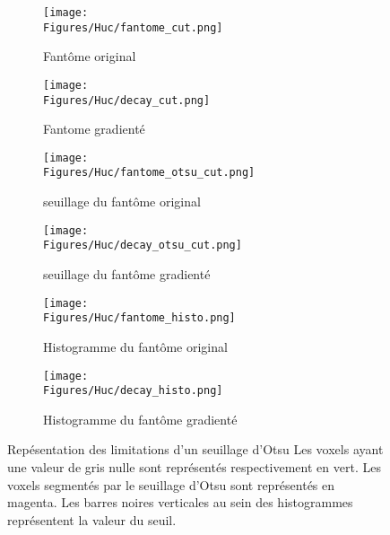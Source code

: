 \documentclass[\main/main.tex]{subfiles}
\begin{document}
\begin{figure}[t]
    \centering
    \begin{subfigure}[b]{0.45\textwidth}
        \caption{Fantôme original}
        \centering \texttt{[image: \\Figures/Huc/fantome\_cut.png]}
        \label{fig:huc:defaut:otsu:fantome:fantome}
    \end{subfigure}
    \begin{subfigure}[b]{0.45\textwidth}
        \caption{Fantome gradienté}
        \centering \texttt{[image: \\Figures/Huc/decay\_cut.png]}
        \label{fig:huc:defaut:otsu:decay:fantome}
    \end{subfigure}
    \begin{subfigure}[b]{0.45\textwidth} 
        \caption{seuillage du fantôme original}
        \centering \texttt{[image: \\Figures/Huc/fantome\_otsu\_cut.png]}
        \label{fig:huc:defaut:otsu:fantome:otsu}
    \end{subfigure}
    \begin{subfigure}[b]{0.45\textwidth} 
        \caption{seuillage du fantôme gradienté}
        \centering \texttt{[image: \\Figures/Huc/decay\_otsu\_cut.png]}
        \label{fig:huc:defaut:otsu:decay:otsu}
    \end{subfigure}
    \begin{subfigure}[b]{0.45\textwidth} 
        \caption{Histogramme du fantôme original}
        \centering \texttt{[image: \\Figures/Huc/fantome\_histo.png]}
        \label{fig:huc:defaut:otsu:fantome:histo}
    \end{subfigure}
    \begin{subfigure}[b]{0.45\textwidth} 
        \caption{Histogramme du fantôme gradienté}
        \centering \texttt{[image: \\Figures/Huc/decay\_histo.png]}
        \label{fig:huc:defaut:otsu:decay:histo}
    \end{subfigure}
    \caption{
        Repésentation des limitations d'un seuillage d'Otsu
        \newline
        Les voxels ayant une valeur de gris nulle  sont représentés respectivement en vert.
        Les voxels segmentés par le seuillage d'Otsu sont représentés en magenta.
        Les barres noires verticales au sein des histogrammes représentent la valeur du seuil.
        }
    \label{fig:sblc:defaut:surface}
\end{figure}
\end{document}
